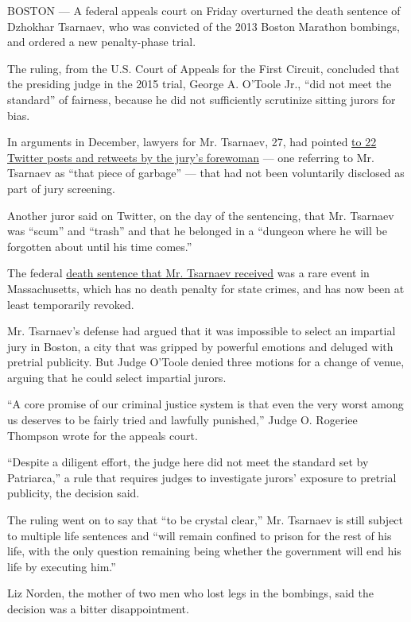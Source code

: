 BOSTON --- A federal appeals court on Friday overturned the death
sentence of Dzhokhar Tsarnaev, who was convicted of the 2013 Boston
Marathon bombings, and ordered a new penalty-phase trial.

The ruling, from the U.S. Court of Appeals for the First Circuit,
concluded that the presiding judge in the 2015 trial, George A. O'Toole
Jr., ``did not meet the standard'' of fairness, because he did not
sufficiently scrutinize sitting jurors for bias.

In arguments in December, lawyers for Mr. Tsarnaev, 27, had pointed
\href{https://www.nytimes.com/2019/12/12/us/boston-marathon-bombing-appeal.html}{to
22 Twitter posts and retweets by the jury's forewoman} --- one referring
to Mr. Tsarnaev as ``that piece of garbage'' --- that had not been
voluntarily disclosed as part of jury screening.

Another juror said on Twitter, on the day of the sentencing, that Mr.
Tsarnaev was ``scum'' and ``trash'' and that he belonged in a ``dungeon
where he will be forgotten about until his time comes.''

The federal
\href{https://www.nytimes.com/2015/05/16/us/dzhokhar-tsarnaev-death-sentence.html}{death
sentence that Mr. Tsarnaev received} was a rare event in Massachusetts,
which has no death penalty for state crimes, and has now been at least
temporarily revoked.

Mr. Tsarnaev's defense had argued that it was impossible to select an
impartial jury in Boston, a city that was gripped by powerful emotions
and deluged with pretrial publicity. But Judge O'Toole denied three
motions for a change of venue, arguing that he could select impartial
jurors.

``A core promise of our criminal justice system is that even the very
worst among us deserves to be fairly tried and lawfully punished,''
Judge O. Rogeriee Thompson wrote for the appeals court.

``Despite a diligent effort, the judge here did not meet the standard
set by Patriarca,'' a rule that requires judges to investigate jurors'
exposure to pretrial publicity, the decision said.

The ruling went on to say that ``to be crystal clear,'' Mr. Tsarnaev is
still subject to multiple life sentences and ``will remain confined to
prison for the rest of his life, with the only question remaining being
whether the government will end his life by executing him.''

Liz Norden, the mother of two men who lost legs in the bombings, said
the decision was a bitter disappointment.

